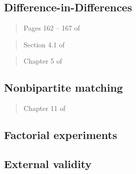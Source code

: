 \documentclass[12pt]{article}
\begin{document}

\subsection{Difference-in-Differences}

\begin{verse} Pages 162 -- 167 of  \end{verse}

\begin{verse} Section 4.1 of  \end{verse}

\begin{verse} Chapter 5 of  \end{verse}

\begin{verse}  \end{verse}

\subsection{Nonbipartite matching}

\begin{verse} Chapter 11 of  \end{verse}

\begin{verse}  \end{verse}

\begin{verse}  \end{verse}

\subsection{Factorial experiments}

\begin{verse}  \end{verse}

\begin{verse}  \end{verse}

\subsection{External validity}
\end{document}
